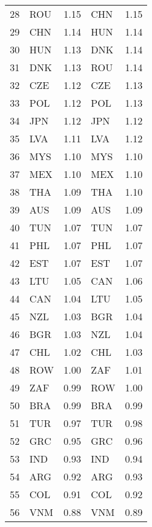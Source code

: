 \begin{table}[H]
\begin{tabular}{llclc}
  28 & ROU & 1.15 & CHN & 1.15 \\ 
  29 & CHN & 1.14 & HUN & 1.14 \\ 
  30 & HUN & 1.13 & DNK & 1.14 \\ 
  31 & DNK & 1.13 & ROU & 1.14 \\ 
  32 & CZE & 1.12 & CZE & 1.13 \\ 
  33 & POL & 1.12 & POL & 1.13 \\ 
  34 & JPN & 1.12 & JPN & 1.12 \\ 
  35 & LVA & 1.11 & LVA & 1.12 \\ 
  36 & MYS & 1.10 & MYS & 1.10 \\ 
  37 & MEX & 1.10 & MEX & 1.10 \\ 
  38 & THA & 1.09 & THA & 1.10 \\ 
  39 & AUS & 1.09 & AUS & 1.09 \\ 
  40 & TUN & 1.07 & TUN & 1.07 \\ 
  41 & PHL & 1.07 & PHL & 1.07 \\ 
  42 & EST & 1.07 & EST & 1.07 \\ 
  43 & LTU & 1.05 & CAN & 1.06 \\ 
  44 & CAN & 1.04 & LTU & 1.05 \\ 
  45 & NZL & 1.03 & BGR & 1.04 \\ 
  46 & BGR & 1.03 & NZL & 1.04 \\ 
  47 & CHL & 1.02 & CHL & 1.03 \\ 
  48 & ROW & 1.00 & ZAF & 1.01 \\ 
  49 & ZAF & 0.99 & ROW & 1.00 \\ 
  50 & BRA & 0.99 & BRA & 0.99 \\ 
  51 & TUR & 0.97 & TUR & 0.98 \\ 
  52 & GRC & 0.95 & GRC & 0.96 \\ 
  53 & IND & 0.93 & IND & 0.94 \\ 
  54 & ARG & 0.92 & ARG & 0.93 \\ 
  55 & COL & 0.91 & COL & 0.92 \\ 
  56 & VNM & 0.88 & VNM & 0.89  \\
\bottomrule 
\end{tabular}
\end{table}
